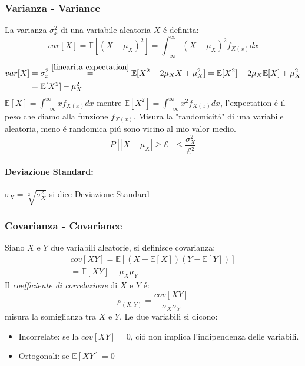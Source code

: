         \subsubsection{Varianza - Variance}
            La varianza $\sigma^2_x$ di una variabile aleatoria $X$ é definita:
            \[
                var[X] = \mathbb{E}[(X-\mu_X)^2] = \int_{-\infty}^{\infty} (X-\mu_X)^2f_{X(x)}dx
            \]  
            \begin{align}
                var[X] &= \sigma^2_x \overset{\ref{linearita expectation}}{=} \mathbb{E}[X^2-2\mu_XX+\mu_X^2] = \mathbb{E}[X^2]-2\mu_X\mathbb{E}[X]+\mu_X^2 \nonumber \\
                           &= \mathbb{E}[X^2]-\mu_X^2 \nonumber 
            \end{align}
            $\mathbb{E}[X] = \int_{-\infty}^{\infty} xf_{X(x)}dx$ mentre $\mathbb{E}[X^2] = \int_{-\infty}^{\infty} x^2f_{X(x)}dx$, l'expectation é il peso che diamo alla funzione $f_{X(x)}$.  
            Misura la "randomicitá" di una variabile aleatoria, meno é randomica piú sono vicino al mio valor medio.
            \[
                P[|X-\mu_X|\geq \mathcal{E}]\leq \frac{\sigma^2_X}{\mathcal{E}^2}
            \]
            \paragraph{Deviazione Standard:} $\sigma_X = \sqrt[2]{\sigma^2_X}$ si dice Deviazione Standard
        \subsubsection{Covarianza - Covariance}
            Siano $X$ e $Y$ due variabili aleatorie, si definisce covarianza:
            \begin{gather}
                cov[XY] = \mathbb{E}[(X-\mathbb{E}[X])(Y-\mathbb{E}[Y])]\nonumber\\
                = \mathbb{E}[XY]-\mu_X\mu_Y\nonumber
            \end{gather}
            Il \emph{coefficiente di correlazione} di $X$ e $Y$ é:
            \[
                \rho_{(X,Y)} = \frac{cov[XY]}{\sigma_X\sigma_Y}
            \]
            misura la somiglianza tra $X$ e $Y$. Le due variabili si dicono:
            \begin{itemize}
                \item {
                    Incorrelate: se la $cov[XY] =0$, ció non implica l'indipendenza delle variabili.
                }
                \item {
                    Ortogonali: se $\mathbb{E}[XY] = 0$
                }
            \end{itemize}
